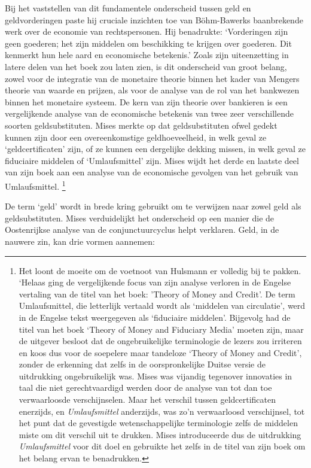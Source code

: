 \documentclass[
  a5paper,
  smalldemyvopaper,11pt,twoside,onecolumn,openright,extrafontsizes,
hidelinks]{memoir}
\begin{document}
Bij het vaststellen van dit fundamentele onderscheid tussen geld en
geldvorderingen paste hij cruciale inzichten toe van Böhm-Bawerks
baanbrekende werk over de economie van rechtspersonen. Hij benadrukte:
`Vorderingen zijn geen goederen; het zijn middelen om beschikking te
krijgen over goederen. Dit kenmerkt hun hele aard en economische
betekenis.' Zoals zijn uiteenzetting in latere delen van het boek zou
laten zien, is dit onderscheid van groot belang, zowel voor de
integratie van de monetaire theorie binnen het kader van Mengers theorie
van waarde en prijzen, als voor de analyse van de rol van het bankwezen
binnen het monetaire systeem. De kern van zijn theorie over bankieren is
een vergelijkende analyse van de economische betekenis van twee zeer
verschillende soorten geldsubstituten. Mises merkte op dat
geldsubstituten ofwel gedekt kunnen zijn door een overeenkomstige
geldhoeveelheid, in welk geval ze `geldcertificaten' zijn, of ze kunnen
een dergelijke dekking missen, in welk geval ze fiduciaire middelen of
`Umlaufsmittel' zijn. Mises wijdt het derde en laatste deel van zijn
boek aan een analyse van de economische gevolgen van het gebruik van
Umlaufsmittel. \footnote{Het loont de moeite om de voetnoot van Hulsmann
  er volledig bij te pakken. `Helaas ging de vergelijkende focus van
  zijn analyse verloren in de Engelse vertaling van de titel van het
  boek: 'Theory of Money and Credit'. De term Umlaufsmittel, die
  letterlijk vertaald wordt als `middelen van circulatie', werd in de
  Engelse tekst weergegeven als `fiduciaire middelen'. Bijgevolg had de
  titel van het boek `Theory of Money and Fiduciary Media' moeten zijn,
  maar de uitgever besloot dat de ongebruikelijke terminologie de lezers
  zou irriteren en koos dus voor de soepelere maar tandeloze `Theory of
  Money and Credit', zonder de erkenning dat zelfs in de oorspronkelijke
  Duitse versie de uitdrukking ongebruikelijk was. Mises was vijandig
  tegenover innovaties in taal die niet gerechtvaardigd werden door de
  analyse van tot dan toe verwaarloosde verschijnselen. Maar het
  verschil tussen geldcertificaten enerzijds, en \textit{Umlaufsmittel}
  anderzijds, was zo'n verwaarloosd verschijnsel, tot het punt dat de
  gevestigde wetenschappelijke terminologie zelfs de middelen miste om
  dit verschil uit te drukken. Mises introduceerde dus de uitdrukking
  \textit{Umlaufsmittel} voor dit doel en gebruikte het zelfs in de
  titel van zijn boek om het belang ervan te benadrukken.}

De term `geld' wordt in brede kring gebruikt om te verwijzen naar zowel
geld als geldsubstituten. Mises verduidelijkt het onderscheid op een
manier die de Oostenrijkse analyse van de conjunctuurcyclus helpt
verklaren. Geld, in de nauwere zin, kan drie vormen aannemen:
\end{document}
